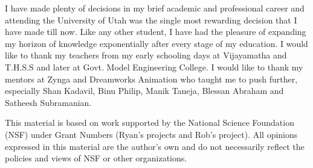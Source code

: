 I have made plenty of decisions in my brief academic and professional career and attending the University of Utah was the single most rewarding decision that I have made till now. 
Like any other student, I have had the pleasure of expanding my horizon of knowledge exponentially after every stage of my education. 
I would like to thank my teachers from my early schooling days at Vijayamatha and T.H.S.S and later at Govt. Model Engineering College. 
I would like to thank my mentors at Zynga and Dreamworks Animation who taught me to push further, especially Shan Kadavil, Binu Philip, Manik Taneja, Blessan Abraham and Satheesh Subramanian.

This material is based on work supported by the National Science Foundation (NSF) under Grant Numbers (Ryan’s projects and Rob’s project). 
All opinions expressed in this material are the author’s own and do not necessarily reflect the policies and views of NSF or other organizations.